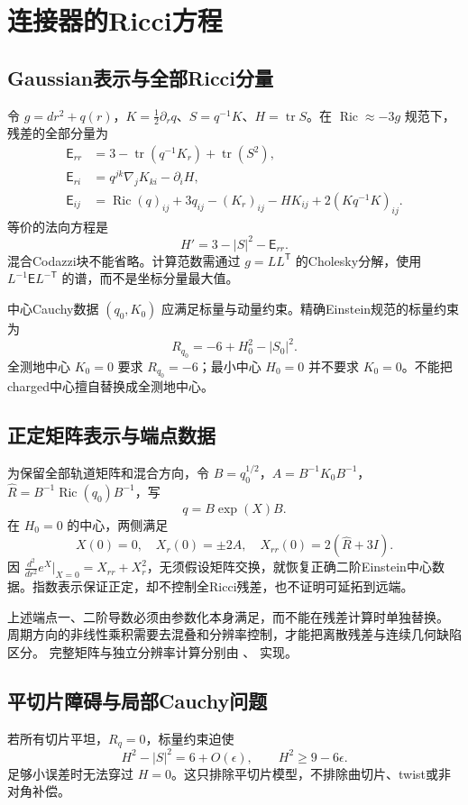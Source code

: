 \documentclass[UTF8,a4paper,11pt,fontset=fandol]{ctexart}
\numberwithin{equation}{section}
\theoremstyle{definition}
\newcommand{\Ric}{\operatorname{Ric}}
\newcommand{\tr}{\operatorname{tr}}
\begin{document}
\section{连接器的Ricci方程}
\subsection{Gaussian表示与全部Ricci分量}
令 $g=dr^2+q(r)$，$K=\frac12\partial_rq$、$S=q^{-1}K$、$H=\tr S$。在 $\Ric\approx-3g$ 规范下，残差的全部分量为
\begin{align}
\mathsf E_{rr}&=3-\tr(q^{-1}K_r)+\tr(S^2),\\
\mathsf E_{ri}&=q^{jk}\nabla_jK_{ki}-\partial_iH,\\
\mathsf E_{ij}&=\Ric(q)_{ij}+3q_{ij}-(K_r)_{ij}-HK_{ij}
+2(Kq^{-1}K)_{ij}.\label{eq:fullRic}
\end{align}
等价的法向方程是
\[
H'=3-|S|^2-\mathsf E_{rr}.
\]
混合Codazzi块不能省略。计算范数需通过 $g=LL^{\mathsf T}$ 的Cholesky分解，使用 $L^{-1}\mathsf E L^{-\mathsf T}$ 的谱，而不是坐标分量最大值。

中心Cauchy数据 $(q_0,K_0)$ 应满足标量与动量约束。精确Einstein规范的标量约束为
\[
R_{q_0}=-6+H_0^2-|S_0|^2.
\]
全测地中心 $K_0=0$ 要求 $R_{q_0}=-6$；最小中心 $H_0=0$ 并不要求 $K_0=0$。不能把charged中心擅自替换成全测地中心。

\subsection{正定矩阵表示与端点数据}
为保留全部轨道矩阵和混合方向，令 $B=q_0^{1/2}$，$A=B^{-1}K_0B^{-1}$，$\widehat R=B^{-1}\Ric(q_0)B^{-1}$，写
\[
q=B\exp(X)B.
\]
在 $H_0=0$ 的中心，两侧满足
\[
X(0)=0,\quad X_r(0)=\pm2A,\quad X_{rr}(0)=2(\widehat R+3I).
\]
因 $\frac{d^2}{dr^2}e^X|_{X=0}=X_{rr}+X_r^2$，无须假设矩阵交换，就恢复正确二阶Einstein中心数据。指数表示保证正定，却不控制全Ricci残差，也不证明可延拓到远端。

上述端点一、二阶导数必须由参数化本身满足，而不能在残差计算时单独替换。
周期方向的非线性乘积需要去混叠和分辨率控制，才能把离散残差与连续几何缺陷区分。
完整矩阵与独立分辨率计算分别由
、
实现。

\subsection{平切片障碍与局部Cauchy问题}
若所有切片平坦，$R_q=0$，标量约束迫使
\[
H^2-|S|^2=6+O(\epsilon),\qquad
H^2\ge9-6\epsilon.
\]
足够小误差时无法穿过 $H=0$。这只排除平切片模型，不排除曲切片、twist或非对角补偿。
\end{document}
